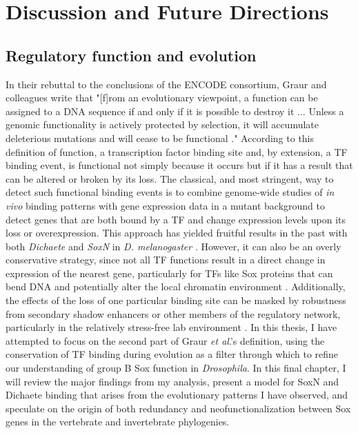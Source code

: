 \chapter{Discussion and Future Directions}

\hrulefill

\section{Regulatory function and evolution}
In their rebuttal to the conclusions of the ENCODE consortium, Graur and colleagues write that "[f]rom an evolutionary viewpoint, a function can be assigned to a DNA sequence if and
only if it is possible to destroy it ... Unless a genomic functionality is actively protected by selection, it will accumulate deleterious mutations and will cease to be functional \citep{graur_immortality_2013}." According to this definition of function, a transcription factor binding site and, by extension, a TF binding event, is functional not simply because it occurs but if it has a result that can be altered or broken by its loss. The classical, and most stringent, way to detect such functional binding events is to combine genome-wide studies of \emph{in vivo} binding patterns with gene expression data in a mutant background to detect genes that are both bound by a TF and change expression levels upon its loss or overexpression. This approach has yielded fruitful results in the past with both \emph{Dichaete} and \emph{SoxN} in \emph{D. melanogaster} \citep{aleksic_role_2013,ferrero_soxneuro_2014,shen_identifying_2013}. However, it can also be an overly conservative strategy, since not all TF functions result in a direct change in expression of the nearest gene, particularly for TFs like Sox proteins that can bend DNA and potentially alter the local chromatin environment \citep{bowles_phylogeny_2000,ferrari_sry_1992,giese_hmg_1992,russell_dichaete_1996}. Additionally, the effects of the loss of one particular binding site can be masked by robustness from secondary shadow enhancers or other members of the regulatory network, particularly in the relatively stress-free lab environment \citep{aldana_robustness_2007,ciliberti_innovation_2007,ludwig_consequences_2011,perry_shadow_2010}. In this thesis, I have attempted to focus on the second part of Graur \emph{et al}.'s definition, using the conservation of TF binding during evolution as a filter through which to refine our understanding of group B Sox function in \emph{Drosophila}. In this final chapter, I will review the major findings from my analysis, present a model for SoxN and Dichaete binding that arises from the evolutionary patterns I have observed, and speculate on the origin of both redundancy and neofunctionalization between Sox genes in the vertebrate and invertebrate phylogenies.

